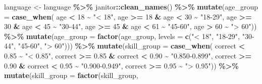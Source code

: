 \documentclass[12pt]{article}
\newenvironment{Shaded}{\begin{snugshade}}{\end{snugshade}}
\newcommand{\DataTypeTok}[1]{\textcolor[rgb]{0.13,0.29,0.53}{#1}}
\newcommand{\DecValTok}[1]{\textcolor[rgb]{0.00,0.00,0.81}{#1}}
\newcommand{\FloatTok}[1]{\textcolor[rgb]{0.00,0.00,0.81}{#1}}
\newcommand{\KeywordTok}[1]{\textcolor[rgb]{0.13,0.29,0.53}{\textbf{#1}}}
\newcommand{\NormalTok}[1]{#1}
\newcommand{\OperatorTok}[1]{\textcolor[rgb]{0.81,0.36,0.00}{\textbf{#1}}}
\newcommand{\StringTok}[1]{\textcolor[rgb]{0.31,0.60,0.02}{#1}}
\begin{document}
\begin{Shaded}
\begin{Highlighting}[]
\NormalTok{language <{-}}\StringTok{ }\NormalTok{language }\OperatorTok{\%>\%}
\StringTok{  }\NormalTok{janitor}\OperatorTok{::}\KeywordTok{clean\_names}\NormalTok{() }\OperatorTok{\%>\%}
\StringTok{  }\KeywordTok{mutate}\NormalTok{(}\DataTypeTok{age\_group =} \KeywordTok{case\_when}\NormalTok{(}
\NormalTok{    age }\OperatorTok{<}\StringTok{ }\DecValTok{18} \OperatorTok{\textasciitilde{}}\StringTok{ "< 18"}\NormalTok{,}
\NormalTok{    age }\OperatorTok{>=}\StringTok{ }\DecValTok{18} \OperatorTok{\&}\StringTok{ }\NormalTok{age }\OperatorTok{<}\StringTok{ }\DecValTok{30} \OperatorTok{\textasciitilde{}}\StringTok{ "18{-}29"}\NormalTok{,}
\NormalTok{    age }\OperatorTok{>=}\StringTok{ }\DecValTok{30} \OperatorTok{\&}\StringTok{ }\NormalTok{age }\OperatorTok{<}\StringTok{ }\DecValTok{45} \OperatorTok{\textasciitilde{}}\StringTok{ "30{-}44"}\NormalTok{,}
\NormalTok{    age }\OperatorTok{>=}\StringTok{ }\DecValTok{45} \OperatorTok{\&}\StringTok{ }\NormalTok{age }\OperatorTok{<}\StringTok{ }\DecValTok{61} \OperatorTok{\textasciitilde{}}\StringTok{ "45{-}60"}\NormalTok{,}
\NormalTok{    age }\OperatorTok{>}\StringTok{ }\DecValTok{60} \OperatorTok{\textasciitilde{}}\StringTok{ "> 60"}\NormalTok{)) }\OperatorTok{\%>\%}
\StringTok{  }\KeywordTok{mutate}\NormalTok{(}\DataTypeTok{age\_group =} \KeywordTok{factor}\NormalTok{(age\_group, }
                            \DataTypeTok{levels =} \KeywordTok{c}\NormalTok{(}\StringTok{"< 18"}\NormalTok{, }\StringTok{"18{-}29"}\NormalTok{, }
                                       \StringTok{"30{-}44"}\NormalTok{, }\StringTok{"45{-}60"}\NormalTok{, }
                                       \StringTok{"> 60"}\NormalTok{))) }\OperatorTok{\%>\%}
\StringTok{  }\KeywordTok{mutate}\NormalTok{(}\DataTypeTok{skill\_group =} \KeywordTok{case\_when}\NormalTok{(}
\NormalTok{    correct }\OperatorTok{<}\StringTok{ }\FloatTok{0.85} \OperatorTok{\textasciitilde{}}\StringTok{ "< 0.85"}\NormalTok{,}
\NormalTok{    correct }\OperatorTok{>=}\StringTok{ }\FloatTok{0.85} \OperatorTok{\&}\StringTok{ }\NormalTok{correct }\OperatorTok{<}\StringTok{ }\FloatTok{0.90} \OperatorTok{\textasciitilde{}}\StringTok{ "0.850{-}0.899"}\NormalTok{,}
\NormalTok{    correct }\OperatorTok{>=}\StringTok{ }\FloatTok{0.90} \OperatorTok{\&}\StringTok{ }\NormalTok{correct }\OperatorTok{<}\StringTok{ }\FloatTok{0.95} \OperatorTok{\textasciitilde{}}\StringTok{ "0.900{-}0.949"}\NormalTok{,}
\NormalTok{    correct }\OperatorTok{>=}\StringTok{ }\FloatTok{0.95} \OperatorTok{\textasciitilde{}}\StringTok{ "> 0.95"}\NormalTok{)) }\OperatorTok{\%>\%}
\StringTok{  }\KeywordTok{mutate}\NormalTok{(}\DataTypeTok{skill\_group =} \KeywordTok{factor}\NormalTok{(skill\_group, }

\end{Highlighting}
\end{Shaded}
\end{document}
